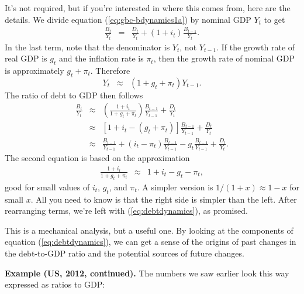It's not required, but if you're interested in where this comes from,
here are the details.
We divide equation (\ref{eq:gbc-bdynamics1a}) by nominal GDP $Y_t$ to get
\begin{eqnarray*}
    \frac{B_{t}}{Y_{t}} &=& %
            \frac{D_{t}}{Y_{t}}
            +  (1+i_t) \frac{B_{t-1}}{Y_{t}}  .
\end{eqnarray*}
In the last term, note that the denominator is $Y_t$, not $Y_{t-1}$.
If the growth rate of real GDP is $g_t$ and the inflation rate is $\pi_t$,
then the growth rate of nominal GDP is approximately $g_t + \pi_t$.
Therefore
\[
    Y_{t} \;\;\approx\;\; (1+g_t+\pi_t) Y_{t-1}.
\]
The ratio of debt to GDP then follows
\begin{eqnarray*}
    \frac{B_{t}}{Y_{t}}
            &\approx&
                \left( \frac{1+i_t}{1+g_t+\pi_t} \right)  \frac{B_{t-1}}{Y_{t-1}}
             +    \frac{D_{t}}{Y_{t}}  \nonumber \\
            &\approx&
                \left[ 1 + i_t - (g_t+\pi_t) \right]  \frac{B_{t-1}}{Y_{t-1}}
             +    \frac{D_{t}}{Y_{t}}   \nonumber \\
            &\approx&
                \frac{B_{t-1}}{Y_{t-1}} + (i_t-\pi_t) \frac{B_{t-1}}{Y_{t-1}}
                - g_t \frac{B_{t-1}}{Y_{t-1}}
             +    \frac{D_{t}}{Y_{t}}  .
\end{eqnarray*}
The second equation is based on the approximation
\begin{eqnarray*}
    \frac{1+i_t}{1+g_t+\pi_t} &\approx& 1 + i_t - g_t - \pi_t ,
\end{eqnarray*}
good for small values of $i_t$, $g_t$, and $\pi_t$.
A simpler version is $1/(1+x) \approx 1-x $ for small $x$.
All you need to know is that the right side is simpler than the left.
After rearranging terms, we're left with (\ref{eq:debtdynamics}), as promised.


This is a mechanical analysis, but a useful one.
By looking at the components of equation (\ref{eq:debtdynamics}),
we can get a sense of the origins of past changes in the debt-to-GDP ratio
and the potential sources of future changes.


{\bf Example (US, 2012, continued).}
The numbers we saw earlier look this way expressed as ratios to GDP:

